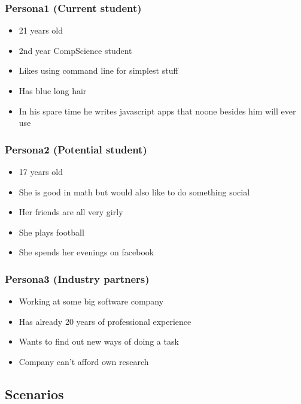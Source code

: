 \subsubsection{Persona1 (Current student)}
\begin{itemize}
	\item 21 years old
	\item 2nd year CompScience student
	\item Likes using command line for simplest stuff
	\item Has blue long hair
	\item In his spare time he writes javascript apps that noone besides him will ever use
\end{itemize}

\pagebreak
\subsubsection{Persona2 (Potential student)}
\begin{itemize}
	\item 17 years old
	\item She is good in math but would also like to do something social
	\item Her friends are all very girly
	\item She plays football
	\item She spends her evenings on facebook
\end{itemize}

\pagebreak
\subsubsection{Persona3 (Industry partners)}
\begin{itemize}
	\item Working at some big software company
	\item Has already 20 years of professional experience
	\item Wants to find out new ways of doing a task
	\item Company can't afford own research
\end{itemize}

\pagebreak
\subsection{Scenarios}